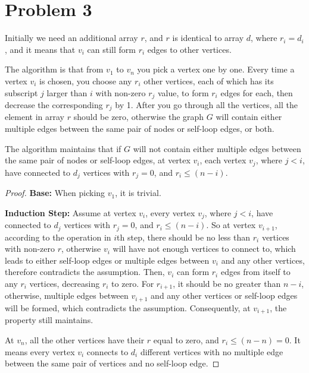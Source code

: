 \documentclass[letter,12pt]{article}
\begin{document}
\section*{Problem 3}
Initially we need an additional array $r$, and $r$ is identical to array 
$d$, where $r_i = d_i$, and it means that $v_i$ can still form $r_i$
edges to other vertices.

The algorithm is that from $v_1$ to $v_n$ you pick a vertex one by one.
Every time a vertex $v_i$ is chosen, you choose any $r_i$ other vertices,
each of which has its subscript $j$ larger than $i$ with non-zero $r_j$ 
value, to form $r_i$ edges for each, then decrease the corresponding
$r_j$ by 1. After you go through all the vertices, all the element in array 
$r$ should be zero, otherwise the graph $G$ will contain either multiple 
edges between the same pair of nodes or self-loop edges, or both.

The algorithm maintains that if $G$ will not contain either multiple 
edges between the same pair of nodes or self-loop edges, at vertex 
$v_i$, each vertex $v_j$, where $j<i$, have connected to $d_j$ vertices 
with $r_j = 0$, and $r_i \le (n-i)$.
\begin{proof}
\textbf{Base:} When picking $v_1$, it is trivial.

\textbf{Induction Step:} Assume at vertex $v_i$, every vertex $v_j$,
where $j<i$, have connected to $d_j$ vertices with $r_j = 0$, and 
$r_i \le (n-i)$. So at vertex $v_{i+1}$, according to the operation
in $i$th step, there should be no less than $r_i$ vertices with non-zero
$r$, otherwise $v_i$ will have not enough vertices to connect to,
which leads to either self-loop edges or multiple edges between $v_i$
and any other vertices, therefore contradicts the assumption. Then, 
$v_i$ can form $r_i$ edges from itself to any $r_i$ vertices, decreasing
$r_i$ to zero. For $r_{i+1}$, it should be no greater than $n-i$,
otherwise, multiple edges between $v_{i+1}$ and any other vertices
or self-loop edges will be formed, which contradicts the assumption.
Consequently, at $v_{i+1}$, the property still maintains.

At $v_n$, all the other vertices have their $r$ equal to zero, and $r_i \le 
(n-n) = 0$. It means every vertex $v_i$ connects to $d_i$ different
vertices with no multiple edge between the same pair of vertices and
no self-loop edge.
\end{proof}

\end{document}
